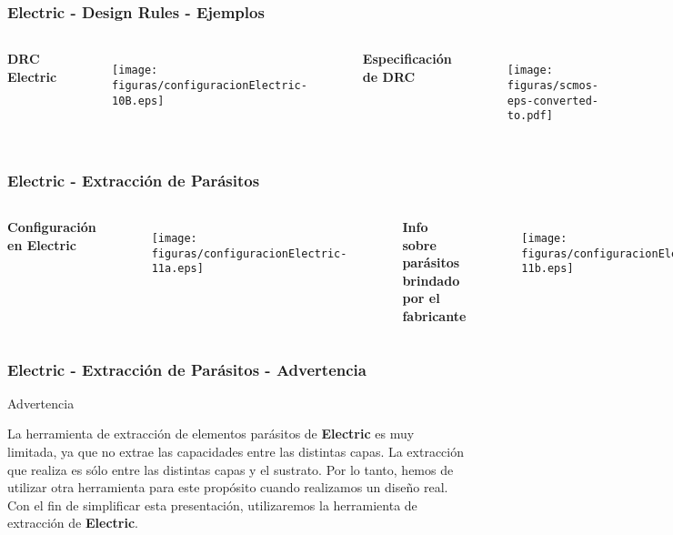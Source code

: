 \documentclass{beamer}
\begin{document}
\begin{frame}
\frametitle{Electric - Design Rules - Ejemplos}
\begin{columns}[t] %
\textbf{DRC Electric}
\begin{figure}
\texttt{[image: figuras/configuracionElectric-10B.eps]}
\end{figure}
\textbf{Especificación de DRC}
\begin{figure}
\texttt{[image: figuras/scmos-eps-converted-to.pdf]}
\end{figure}

\end{columns}
\end{frame}

\begin{frame}[fragile]
\frametitle{Electric - Extracción de Parásitos}
\begin{columns}[t] %
\textbf{Configuración en Electric}
\begin{figure}
\texttt{[image: figuras/configuracionElectric-11a.eps]}
\end{figure}

\textbf{Info sobre parásitos brindado por el fabricante}
\begin{figure}
\texttt{[image: figuras/configuracionElectric-11b.eps]}
\end{figure}
\vspace{-0.8cm}
\begin{figure}
\texttt{[image: figuras/configuracionElectric-11c.eps]}
\end{figure}


\end{columns}
\end{frame}

\begin{frame}
\frametitle{Electric - Extracción de Parásitos - Advertencia}
\begin{Huge}\centerline{Advertencia}
\end{Huge}

La herramienta de extracción de elementos parásitos de \textbf{Electric} es muy limitada, ya que no extrae las capacidades entre las distintas capas. La extracción que realiza es sólo entre las distintas capas y el sustrato. Por lo tanto, hemos de utilizar otra herramienta para este propósito cuando realizamos un diseño real. Con el fin de simplificar esta presentación, utilizaremos la herramienta de extracción de \textbf{Electric}.  
\end{frame}
\end{document}
